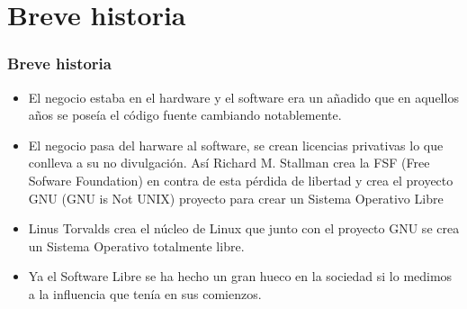 \documentclass{beamer}
\begin{document}
	\section{Breve historia}
		\begin{frame}
			\frametitle{Breve historia}
			\begin{itemize}
				\item<1->[70's] El negocio estaba en el hardware y el software era un añadido que en aquellos años se poseía el código fuente
					cambiando notablemente.
				\item<2->[80's] El negocio pasa del harware al software, se crean licencias privativas lo que conlleva a su no divulgación. Así
					Richard M. Stallman crea la FSF (Free Sofware Foundation) en contra de esta pérdida de libertad y crea el proyecto GNU (GNU is 
					Not UNIX) proyecto para crear un Sistema Operativo Libre
				\item<3->[90's] Linus Torvalds crea el núcleo de Linux que junto con el proyecto GNU se crea un Sistema Operativo totalmente libre.
				\item<4->['00-Hoy] Ya el Software Libre se ha hecho un gran hueco en la sociedad si lo medimos a la influencia que tenía en sus comienzos.
			\end{itemize}
		\end{frame}
\end{document}
